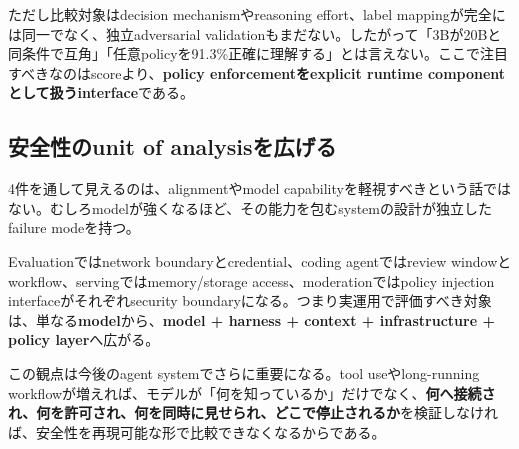 ただし比較対象はdecision mechanismやreasoning effort、label mappingが完全には同一でなく、独立adversarial validationもまだない。したがって「3Bが20Bと同条件で互角」「任意policyを91.3\%正確に理解する」とは言えない。ここで注目すべきなのはscoreより、\textbf{policy enforcementをexplicit runtime componentとして扱うinterface}である\cite{shieldstral-paper}。

\subsection*{安全性のunit of analysisを広げる}

4件を通して見えるのは、alignmentやmodel capabilityを軽視すべきという話ではない。むしろmodelが強くなるほど、その能力を包むsystemの設計が独立したfailure modeを持つ。

Evaluationではnetwork boundaryとcredential、coding agentではreview windowとworkflow、servingではmemory/storage access、moderationではpolicy injection interfaceがそれぞれsecurity boundaryになる。つまり実運用で評価すべき対象は、単なる\textbf{model}から、\textbf{model + harness + context + infrastructure + policy layer}へ広がる。

この観点は今後のagent systemでさらに重要になる。tool useやlong-running workflowが増えれば、モデルが「何を知っているか」だけでなく、\textbf{何へ接続され、何を許可され、何を同時に見せられ、どこで停止されるか}を検証しなければ、安全性を再現可能な形で比較できなくなるからである。
